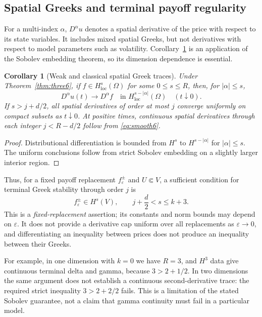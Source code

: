 \documentclass[11pt,a4paper]{article}
\newtheorem{corollary}[theorem]{Corollary}
\theoremstyle{definition}\newtheorem{definition}{Definition}[section]\newtheorem{example}[theorem]{Example}
\theoremstyle{remark}\newtheorem{remark}[theorem]{Remark}\newtheorem{remarkSix}{Remark}[section]
\newcommand{\loc}{\mathrm{loc}}
\begin{document}
\subsection{Spatial Greeks and terminal payoff regularity}
\label{subsec:greeks6}
For a multi-index $\alpha$, $D^\alpha u$ denotes a spatial derivative of the price with respect to its state variables. It includes mixed spatial Greeks, but not derivatives with respect to model parameters such as volatility. Corollary~\ref{cor:greeks6} is an application of the Sobolev embedding theorem, so its dimension dependence is essential.

\begin{corollary}[Weak and classical spatial Greek traces]\label{cor:greeks6}
Under Theorem~\ref{thm:three6}, if $f\in H^s_{\loc}(\Omega)$ for some $0\le s\le R$, then, for $|\alpha|\le s$,
\begin{equation}\label{eq:weakGreek6}
 D^\alpha u(t)\to D^\alpha f\quad
 \text{in }H^{s-|\alpha|}_{\loc}(\Omega)\quad(t\downarrow0).
\end{equation}
If $s>j+d/2$, all spatial derivatives of order at most $j$ converge uniformly on compact subsets as $t\downarrow0$. At positive times, continuous spatial derivatives through each integer $j<R-d/2$ follow from \eqref{eq:smooth6}.
\end{corollary}
\begin{proof}
Distributional differentiation is bounded from $H^s$ to $H^{s-|\alpha|}$ for $|\alpha|\le s$. The uniform conclusions follow from strict Sobolev embedding on a slightly larger interior region.
\end{proof}

Thus, for a fixed payoff replacement $f_\varepsilon^\pm$ and $U\Subset V$, a sufficient condition for terminal Greek stability through order $j$ is
\begin{equation}\label{eq:margin6}
 f_\varepsilon^\pm\in H^s(V),\qquad
 j+\frac d2<s\le k+3.
\end{equation}
This is a \emph{fixed-replacement} assertion; its constants and norm bounds may depend on $\varepsilon$. It does not provide a derivative cap uniform over all replacements as $\varepsilon\to0$, and differentiating an inequality between prices does not produce an inequality between their Greeks.

For example, in one dimension with $k=0$ we have $R=3$, and $H^3$ data give continuous terminal delta and gamma, because $3>2+1/2$. In two dimensions the same argument does not establish a continuous second-derivative trace: the required strict inequality $3>2+2/2$ fails. This is a limitation of the stated Sobolev guarantee, not a claim that gamma continuity must fail in a particular model.
\end{document}
